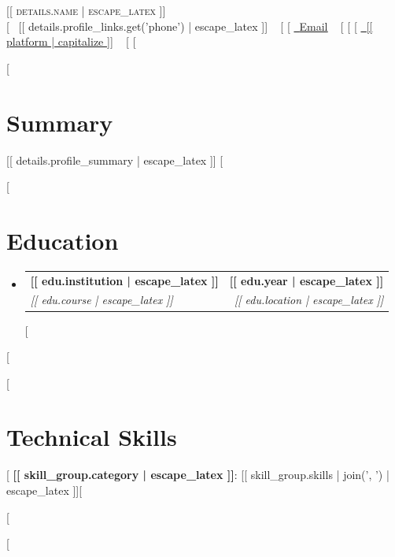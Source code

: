 \documentclass[letterpaper,11pt]{article}
\makeatletter
\newcommand{\resumeSubheading}[4]{
  \vspace{-2pt}\item
    \begin{tabular*}{1.0\textwidth}[t]{l@{\extracolsep{\fill}}r}
      \textbf{#1} & \textbf{\small #2} \\
      \textit{\small#3} & \textit{\small #4} \\
    \end{tabular*}\vspace{-7pt}
}
\newcommand{\resumeSubHeadingListStart}{\begin{itemize}[leftmargin=0.0in, label={}]}
\newcommand{\resumeSubHeadingListEnd}{\end{itemize}}
\makeatother
\begin{document}
\begin{center}
    {\Huge \scshape [[ details.name | escape_latex ]]} \\ \vspace{1pt}
    \small
    [%
    \raisebox{-0.1\height}\faPhone\ [[ details.profile_links.get('phone') | escape_latex ]] ~
    [%
    [%
    \href{mailto:[[ details.profile_links.get('email') ]]}{\raisebox{-0.2\height}\faEnvelope\ \underline{Email}} ~
    [%
    [%
    [%
    \href{[% if url.startswith('http') %][[ url ]][% else %]https://[[ url ]][% endif %]}{\raisebox{-0.2\height}\faLink\ \underline{[[ platform | capitalize ]]}} ~
    [%
    [%
    \vspace{-8pt}
\end{center}

[%
\section{Summary}
\small [[ details.profile_summary | escape_latex ]]
\vspace{-10pt}
[%

[%
\section{Education}
  \resumeSubHeadingListStart
    [%
    \resumeSubheading
      {[[ edu.institution | escape_latex ]]}{[[ edu.year | escape_latex ]]}
      {[[ edu.course | escape_latex ]]}{[[ edu.location | escape_latex ]]}
    [%
  \resumeSubHeadingListEnd
[%

[%
\section{Technical Skills}
 \begin{itemize}[leftmargin=0.15in, label={}]
    \small{\item{
    [%
     \textbf{[[ skill_group.category | escape_latex ]]}{: [[ skill_group.skills | join(', ') | escape_latex ]]}[%

    [%
    }}
 \end{itemize}
 \vspace{-16pt}
[%
\end{document}
